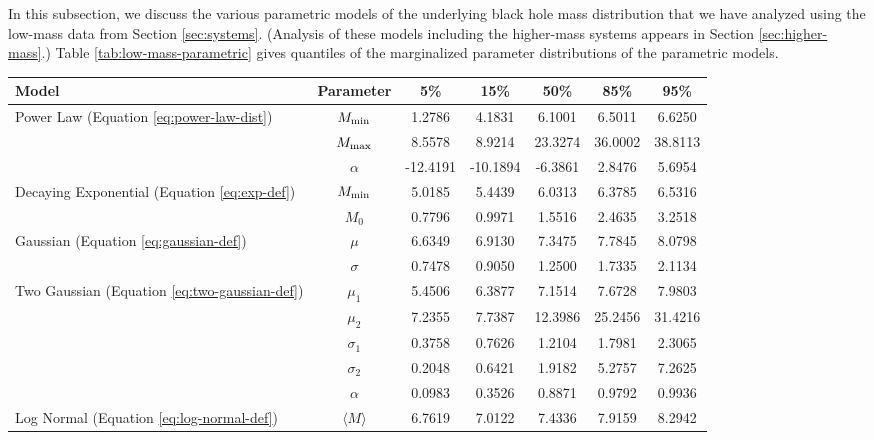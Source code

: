 \documentclass[preprint]{aastex}
\newcommand{\Mmin}{M_{\textnormal{min}}}
\newcommand{\Mmax}{M_{\textnormal{max}}}
\begin{document}
In this subsection, we discuss the various parametric models of the
underlying black hole mass distribution that we have analyzed using
the low-mass data from Section \ref{sec:systems}.  (Analysis of these
models including the higher-mass systems appears in Section
\ref{sec:higher-mass}.)  Table \ref{tab:low-mass-parametric} gives
quantiles of the marginalized parameter distributions of the
parametric models.

\begin{table}
  \begin{center}
    \begin{tabular}{|l|c|c|c|c|c|c|}
      \hline
      Model & Parameter & 5\% & 15\% & 50\% & 85\% & 95\% \\
      \hline \hline
      Power Law (Equation \eqref{eq:power-law-dist}) & $\Mmin$ & 
      1.2786 &  4.1831 &  6.1001 &  6.5011 &  6.6250 \\
      \hline
       & $\Mmax$ & 8.5578 &  8.9214 & 23.3274 & 36.0002 & 38.8113 \\
       \hline
       & $\alpha$ & -12.4191 & -10.1894 & -6.3861 &  2.8476 &  5.6954 \\
       \hline \hline
       Decaying Exponential (Equation \eqref{eq:exp-def}) & $\Mmin$ & 
       5.0185 &  5.4439 &  6.0313 &  6.3785 &  6.5316 \\
       \hline
       & $M_0$ & 0.7796 &  0.9971 & 1.5516 &  2.4635 &  3.2518 \\
       \hline \hline
       Gaussian (Equation \eqref{eq:gaussian-def}) & $\mu$ & 
       6.6349 &  6.9130 &  7.3475 & 7.7845 & 8.0798 \\
       \hline
       & $\sigma$ & 0.7478 &  0.9050  & 1.2500 &  1.7335 & 2.1134 \\
       \hline \hline
       Two Gaussian (Equation \eqref{eq:two-gaussian-def}) & $\mu_1$ & 
       5.4506 &  6.3877 &  7.1514 &  7.6728  & 7.9803 \\
       \hline
       & $\mu_2$ & 7.2355 &  7.7387 & 12.3986 & 25.2456 & 31.4216 \\
       \hline
       & $\sigma_1$ & 0.3758 &  0.7626 &  1.2104 &  1.7981 &  2.3065 \\
       \hline
       & $\sigma_2$ & 0.2048 & 0.6421 & 1.9182 &  5.2757  & 7.2625 \\
       \hline
       & $\alpha$ & 0.0983 &  0.3526 & 0.8871 &  0.9792 &  0.9936 \\
       \hline \hline
       Log Normal (Equation \eqref{eq:log-normal-def}) & $\langle M \rangle$ & 
       6.7619 &  7.0122 &  7.4336  &  7.9159  &  8.2942 \\

\end{tabular}
\end{center}
\end{table}
\end{document}
